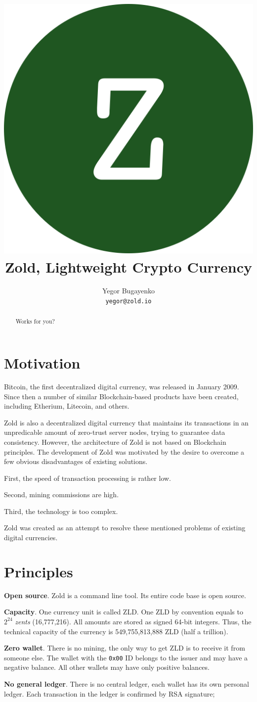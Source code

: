 \documentclass[11pt,oneside]{article}
\title{\includegraphics[scale=0.05]{logo.png}\\Zold, Lightweight Crypto Currency}
\author{Yegor Bugayenko\\\texttt{yegor@zold.io}}
\newcommand\dd[1]{\colorbox{gray!30}{\texttt{#1}}}
\begin{document}
\raggedbottom
\maketitle
\begin{abstract}
Works for you?
\end{abstract}

\section{Motivation}

Bitcoin, the first decentralized digital currency, was released in
January 2009. Since then a number of similar Blockchain-based products have been
created, including Etherium, Litecoin, and others.

Zold is also a decentralized digital currency that maintains its transactions
in an unpredicable amount of zero-trust server nodes, trying to guarantee
data consistency. However, the architecture of Zold is not based on Blockchain
principles. The development of Zold was motivated by the desire to overcome
a few obvious disadvantages of existing solutions.

First, the speed of transaction processing is rather low.

Second, mining commissions are high.

Third, the technology is too complex.

Zold was created as an attempt to resolve these mentioned problems
of existing digital currencies.

\section{Principles}

\textbf{Open source}.
Zold is a command line tool. Its entire code base is open source.

\textbf{Capacity}.
One currency unit is called ZLD.
One ZLD by convention equals to $2^{24}$ \emph{zents} (16,777,216).
All amounts are stored as signed 64-bit integers.
Thus, the technical capacity of the currency is 549,755,813,888 ZLD (half a trillion).

\textbf{Zero wallet}.
There is no mining, the only way to get ZLD is to receive it from someone else.
The wallet with the \dd{0x00} ID belongs to the
issuer and may have a negative balance. All other wallets
may have only positive balances.

\textbf{No general ledger}.
There is no central ledger, each wallet has its own personal ledger.
Each transaction in the ledger is confirmed by RSA signature;
\end{document}

